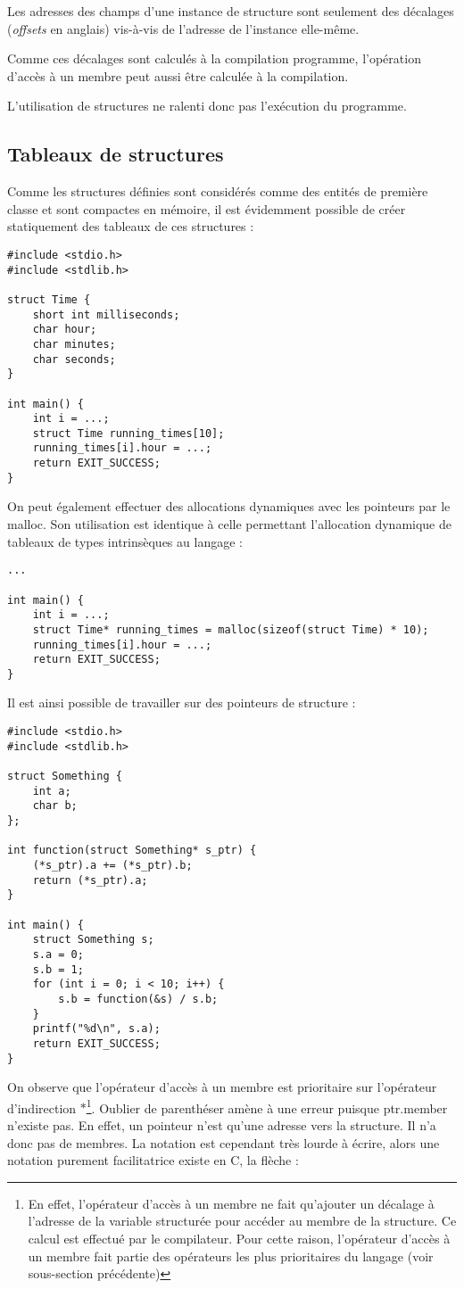 \documentclass[../../../main.tex]{subfiles}
\begin{document}
Les adresses des champs d'une instance de structure sont seulement des décalages (\textit{offsets} en anglais) vis-à-vis de l'adresse de l'instance elle-même.

Comme ces décalages sont calculés à la compilation programme, l'opération d'accès à un membre peut aussi être calculée à la compilation.

L'utilisation de structures ne ralenti donc pas l'exécution du programme.
\subsection{Tableaux de structures}
\label{sub:tableaux_de_structures}
Comme les structures définies sont considérés comme des entités de première classe et sont compactes en mémoire, il est évidemment possible de créer statiquement des tableaux de ces structures :
\begin{verbatim}
#include <stdio.h>
#include <stdlib.h>

struct Time {
	short int milliseconds;
	char hour;
	char minutes;
	char seconds;
}

int main() {
	int i = ...;
	struct Time running_times[10];
	running_times[i].hour = ...;
	return EXIT_SUCCESS;
}
\end{verbatim}
On peut également effectuer des allocations dynamiques avec les pointeurs par le \textsf{malloc}. Son utilisation est identique à celle permettant l'allocation dynamique de tableaux de types intrinsèques au langage :
\begin{verbatim}
...

int main() {
	int i = ...;
	struct Time* running_times = malloc(sizeof(struct Time) * 10);
	running_times[i].hour = ...;
	return EXIT_SUCCESS;
}
\end{verbatim}
Il est ainsi possible de travailler sur des pointeurs de structure :
\begin{verbatim}
#include <stdio.h>
#include <stdlib.h>

struct Something {
	int a;
	char b;
};

int function(struct Something* s_ptr) {
	(*s_ptr).a += (*s_ptr).b;
	return (*s_ptr).a;
}

int main() {
	struct Something s;
	s.a = 0;
	s.b = 1;
	for (int i = 0; i < 10; i++) {
		s.b = function(&s) / s.b;
	}
	printf("%d\n", s.a);
	return EXIT_SUCCESS;
}
\end{verbatim}
On observe que l'opérateur d'accès à un membre est prioritaire sur l'opérateur d'indirection $*$\footnote{En effet, l'opérateur d'accès à un membre ne fait qu'ajouter un décalage à l'adresse de la variable structurée pour accéder au membre de la structure. Ce calcul est effectué par le compilateur. Pour cette raison, l'opérateur d'accès à un membre fait partie des opérateurs les plus prioritaires du langage (voir sous-section précédente)}. Oublier de parenthéser amène à une erreur puisque \textsf{ptr.member} n'existe pas. En effet, un pointeur n'est qu'une adresse vers la structure. Il n'a donc pas de membres. \newline
La notation est cependant très lourde à écrire, alors une notation purement facilitatrice existe en C, la flèche :
 
\end{document}
